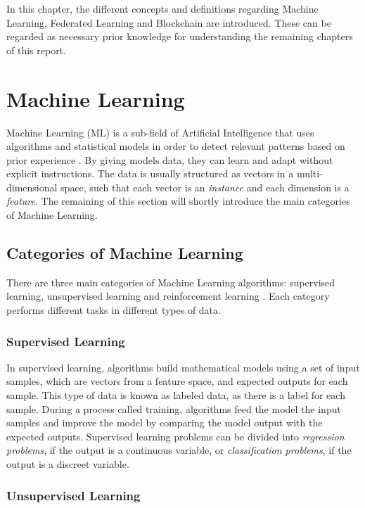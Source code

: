 In this chapter, the different concepts and definitions regarding Machine Learning, Federated Learning and Blockchain are introduced. These can be regarded as necessary prior knowledge for understanding the remaining chapters of this report.

\section{Machine Learning} \label{preliminaries:machine_learning}

Machine Learning (ML) is a sub-field of Artificial Intelligence that uses algorithms and statistical models in order to detect relevant patterns based on prior experience \cite{geron_2019}. By giving models data, they can learn and adapt without explicit instructions. The data is usually structured as vectors in a multi-dimensional space, such that each vector is an \textit{instance} and each dimension is a \textit{feature}. The remaining of this section will shortly introduce the main categories of Machine Learning.

\subsection{Categories of Machine Learning}

There are three main categories of Machine Learning algorithms: supervised learning, unsupervised learning and reinforcement learning \cite{geron_2019}. Each category performs different tasks in different types of data.

\subsubsection{Supervised Learning}

In supervised learning, algorithms build mathematical models using a set of input samples, which are vectors from a feature space, and expected outputs for each sample. This type of data is known as labeled data, as there is a label for each sample. During a process called training, algorithms feed the model the input samples and improve the model by comparing the model output with the expected outputs. Supervised learning problems can be divided into \textit{regression problems}, if the output is a continuous variable, or \textit{classification problems}, if the output is a discreet variable.

\subsubsection{Unsupervised Learning}

